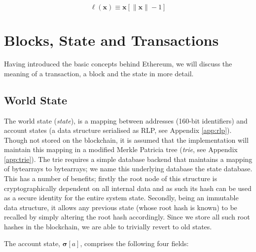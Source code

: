 \documentclass[9pt,oneside]{amsart}
\begin{document}
\begin{multicols}{2}
\begin{equation}
\ell(\mathbf{x}) \equiv \mathbf{x}[\lVert \mathbf{x} \rVert - 1]
\end{equation}

\section{Blocks, State and Transactions} \label{ch:bst}

Having introduced the basic concepts behind Ethereum, we will discuss the meaning of a transaction, a block and the state in more detail.

\subsection{World State} \label{ch:state}

The world state (\textit{state}), is a mapping between addresses (160-bit identifiers) and account states (a data structure serialised as RLP, see Appendix \ref{app:rlp}). Though not stored on the blockchain, it is assumed that the implementation will maintain this mapping in a modified Merkle Patricia tree (\textit{trie}, see Appendix \ref{app:trie}). The trie requires a simple database backend that maintains a mapping of bytearrays to bytearrays; we name this underlying database the state database. This has a number of benefits; firstly the root node of this structure is cryptographically dependent on all internal data and as such its hash can be used as a secure identity for the entire system state. Secondly, being an immutable data structure, it allows any previous state (whose root hash is known) to be recalled by simply altering the root hash accordingly. Since we store all such root hashes in the blockchain, we are able to trivially revert to old states.

The account state, $\boldsymbol{\sigma}[a]$, comprises the following four fields:


\end{multicols}
\end{document}
